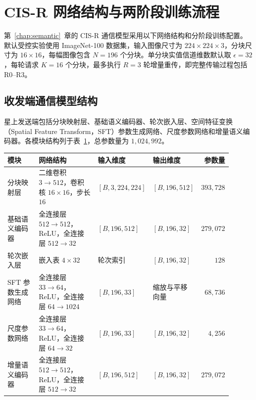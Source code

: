 \section{CIS-R 网络结构与两阶段训练流程}
\label{app:ch6_network_training}

第~\ref{chap:semantic}~章的 CIS-R 通信模型采用以下网络结构和分阶段训练配置。默认受控实验使用 ImageNet-100 数据集，输入图像尺寸为 $224\times224\times3$，分块尺寸为 $16\times16$，每幅图像包含 $N=196$ 个分块。单分块实值信道维数默认取 $\epsilon=32$，每轮请求 $K=16$ 个分块，最多执行 $R=3$ 轮增量重传，即完整传输过程包括 R0--R3。

\subsection{收发端通信模型结构}

星上发送端包括分块映射层、基础语义编码器、轮次嵌入层、空间特征变换（Spatial Feature Transform，SFT）参数生成网络、尺度参数网络和增量语义编码器。各模块结构列于表~\ref{tab:app_ch6_tx_architecture}，总参数量为 $1{,}024{,}992$。

\begin{table}[!htp]
    \centering
    \label{tab:app_ch6_tx_architecture}
    \scriptsize
    \setlength{\tabcolsep}{3.2pt}
    \renewcommand{\arraystretch}{1.13}
    \begin{tabular}{@{}p{0.18\linewidth}p{0.34\linewidth}p{0.19\linewidth}p{0.19\linewidth}r@{}}
        \toprule
        模块 & 网络结构 & 输入维度 & 输出维度 & 参数量 \\
        \midrule
        分块映射层 & 二维卷积 $3\rightarrow512$，卷积核 $16\times16$，步长 $16$ & $[B,3,224,224]$ & $[B,196,512]$ & $393{,}728$ \\
        基础语义编码器 & 全连接层 $512\rightarrow512$，ReLU，全连接层 $512\rightarrow32$ & $[B,196,512]$ & $[B,196,32]$ & $279{,}072$ \\
        轮次嵌入层 & 嵌入表 $4\times32$ & 轮次索引 & $[B,196,32]$ & $128$ \\
        SFT 参数生成网络 & 全连接层 $33\rightarrow64$，ReLU，全连接层 $64\rightarrow1024$ & $[B,196,33]$ & 缩放与平移向量 & $68{,}736$ \\
        尺度参数网络 & 全连接层 $33\rightarrow64$，ReLU，全连接层 $64\rightarrow32$ & $[B,196,33]$ & $[B,196,32]$ & $4{,}256$ \\
        增量语义编码器 & 全连接层 $512\rightarrow512$，ReLU，全连接层 $512\rightarrow32$ & $[B,196,512]$ & $[B,196,32]$ & $279{,}072$ \\
        \bottomrule
    \end{tabular}
\end{table}

